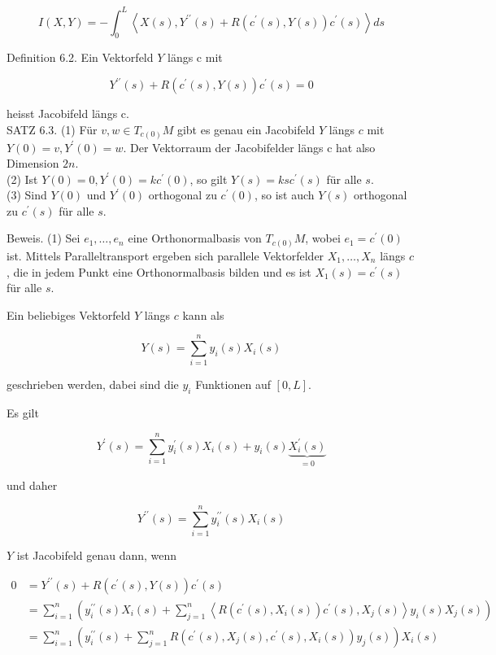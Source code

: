 \documentclass[10pt]{article}
\begin{document}
$$
I(X, Y)=-\int_{0}^{L}\left\langle X(s), Y^{\prime \prime}(s)+R\left(c^{\prime}(s), Y(s)\right) c^{\prime}(s)\right\rangle d s
$$

Definition 6.2. Ein Vektorfeld $Y$ längs c mit


\begin{equation*}
Y^{\prime \prime}(s)+R\left(c^{\prime}(s), Y(s)\right) c^{\prime}(s)=0 \tag{7}
\end{equation*}


heisst Jacobifeld längs c.\\
SATZ 6.3. (1) Für $v, w \in T_{c(0)} M$ gibt es genau ein Jacobifeld $Y$ längs $c$ mit $Y(0)=v, Y^{\prime}(0)=w$. Der Vektorraum der Jacobifelder längs c hat also Dimension $2 n$.\\
(2) Ist $Y(0)=0, Y^{\prime}(0)=k c^{\prime}(0)$, so gilt $Y(s)=k s c^{\prime}(s)$ für alle $s$.\\
(3) Sind $Y(0)$ und $Y^{\prime}(0)$ orthogonal zu $c^{\prime}(0)$, so ist auch $Y(s)$ orthogonal zu $c^{\prime}(s)$ für alle $s$.

Beweis. (1) Sei $e_{1}, \ldots, e_{n}$ eine Orthonormalbasis von $T_{c(0)} M$, wobei $e_{1}=c^{\prime}(0)$ ist. Mittels Paralleltransport ergeben sich parallele Vektorfelder $X_{1}, \ldots, X_{n}$ längs $c$, die in jedem Punkt eine Orthonormalbasis bilden und es ist $X_{1}(s)=c^{\prime}(s)$ für alle $s$.

Ein beliebiges Vektorfeld $Y$ längs $c$ kann als

$$
Y(s)=\sum_{i=1}^{n} y_{i}(s) X_{i}(s)
$$

geschrieben werden, dabei sind die $y_{i}$ Funktionen auf $[0, L]$.

Es gilt

$$
Y^{\prime}(s)=\sum_{i=1}^{n} y_{i}^{\prime}(s) X_{i}(s)+y_{i}(s) \underbrace{X_{i}^{\prime}(s)}_{=0}
$$

und daher

$$
Y^{\prime \prime}(s)=\sum_{i=1}^{n} y_{i}^{\prime \prime}(s) X_{i}(s)
$$

$Y$ ist Jacobifeld genau dann, wenn

$$
\begin{aligned}
0 & =Y^{\prime \prime}(s)+R\left(c^{\prime}(s), Y(s)\right) c^{\prime}(s) \\
& =\sum_{i=1}^{n}\left(y_{i}^{\prime \prime}(s) X_{i}(s)+\sum_{j=1}^{n}\left\langle R\left(c^{\prime}(s), X_{i}(s)\right) c^{\prime}(s), X_{j}(s)\right\rangle y_{i}(s) X_{j}(s)\right) \\
& =\sum_{i=1}^{n}\left(y_{i}^{\prime \prime}(s)+\sum_{j=1}^{n} R\left(c^{\prime}(s), X_{j}(s), c^{\prime}(s), X_{i}(s)\right) y_{j}(s)\right) X_{i}(s)
\end{aligned}
$$
\end{document}
